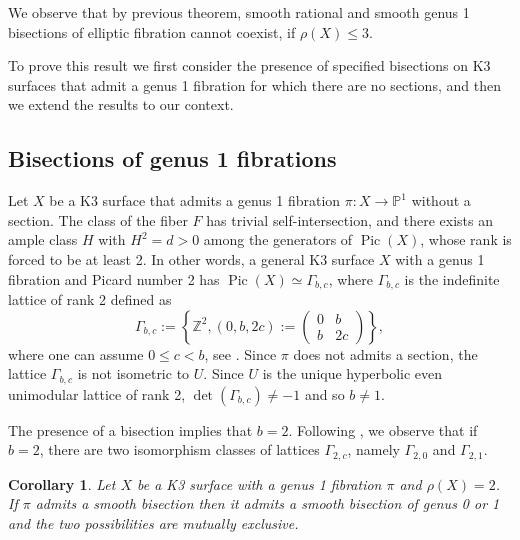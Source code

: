 \documentclass{amsart}
\newtheorem{corollary}[theorem]{Corollary}
\theoremstyle{definition}
\numberwithin{equation}{section}
\newcommand{\ra}{\rightarrow}
\DeclareMathOperator{\Pic}{Pic}
\begin{document}
We observe that by previous theorem, smooth rational and smooth genus 1 bisections of elliptic fibration cannot coexist, if $\rho(X)\leq 3$.

To prove this result we first consider the presence of specified bisections on K3 surfaces that admit a genus 1 fibration for which there are no sections, and then we extend the results to our context.


\subsection{Bisections of genus 1 fibrations}\label{subsect: genus 1 fib on K3}
Let $X$ be a K3 surface that admits a genus 1 fibration $\pi:X\ra \mathbb{P}^1$ without a section. The class of the fiber $F$ has trivial self-intersection, and there exists an ample class $H$ with $H^2=d>0$ among the generators of $\Pic(X)$, whose rank is forced to be at least  2. In other words, a general K3 surface $X$ with a genus 1 fibration and Picard number 2 has $\Pic(X)\simeq \Gamma_{b,c}$, where $\Gamma_{b,c}$ is the indefinite lattice of rank 2 defined as 
\begin{equation}\label{eq: def Gamma}
\Gamma_{b,c}:=\left\{\mathbb{Z}^2, (0,b,2c):= \begin{pmatrix}
0 & b \\
b & 2c 
\end{pmatrix}\right\},
\end{equation}
 where one can assume $0\leq c<b$, see \cite[Remark 4.2]{vanGeemen}.
Since $\pi$ does not admits a section, the lattice $\Gamma_{b,c}$ is not isometric to $U$. Since $U$ is the unique hyperbolic even unimodular lattice of rank 2, $\det(\Gamma_{b,c})\neq -1$ and so $b\neq 1$. 

The presence of a bisection implies that $b=2$. Following \cite{vanGeemen}, we observe that if $b=2$, there are two isomorphism classes of lattices $\Gamma_{2,c}$, namely $\Gamma_{2,0}$ and $\Gamma_{2,1}$. 

\begin{corollary}\label{cor:bisections}
Let $X$ be a K3 surface with a genus 1 fibration $\pi$ and $\rho(X)=2$. If $\pi$ admits a smooth bisection then it admits a smooth bisection of genus 0 or 1 and the two possibilities are mutually exclusive.
\end{corollary}
\end{document}
